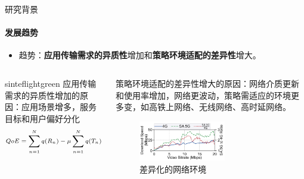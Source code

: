 \documentclass{beamer}
\begin{document}
\begin{frame}[fragile]{研究背景}
\framesubtitle{发展趋势}
    \begin{itemize}
        \item 趋势：\textbf{应用传输需求的异质性}增加和\textbf{策略环境适配的差异性}增大。
    \end{itemize}
    \begin{columns}
        \begin{column}{0.6\textwidth}
            \begin{colorblock}[black]{sinteflightgreen}{}
            应用传输需求的异质性增加的原因：应用场景增多，服务目标和用户偏好分化
            \begin{equation}
                \scriptsize
                \begin{aligned}
                    QoE = \sum_{n=1}^{N}q(R_n) - \mu \sum_{n=1}^{N}q(T_n) - \sum_{n=1}^{N-1}\lvert q(R_{n+1})-q(R_n) \rvert.
                \end{aligned}
                \label{equation-qoe}
            \end{equation}
            
            \end{colorblock}
            
        \end{column}

        \begin{column}{0.45\textwidth}
        
            \begin{block}{}
              策略环境适配的差异性增大的原因：网络介质更新和使用率增加，网络更波动，策略需适应的环境更多变，如高铁上网络、无线网络、高时延网络。
            \begin{figure} [ht]
            \centering
            \includegraphics[width=0.6\textwidth]{figures/applications/趋势.png} 
            \caption{差异化的网络环境\cite{10.1145/3544216.3544219}}
            \end{figure}
            
            \end{block}
              
        \end{column}

    \end{columns}

\end{frame}
\end{document}
